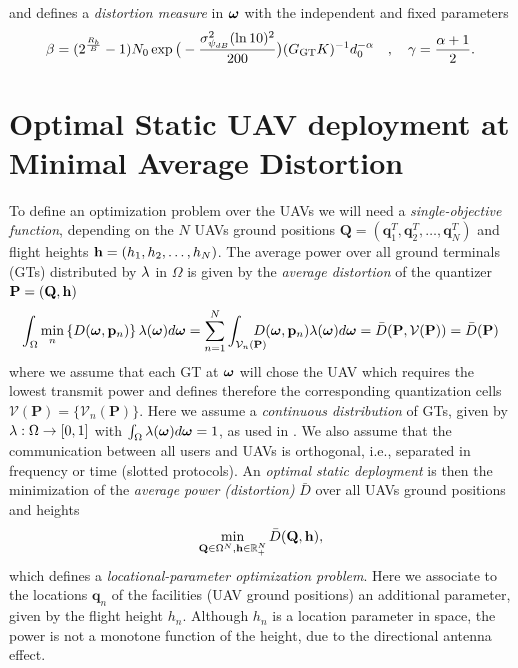 \documentclass[smallabstract,smallcaptions]{dccpaper}
\renewcommand{\vq}{\mathbf p}
\renewcommand{\vp}{\mathbf q}
\renewcommand{\vQ}{\mathbf P}
\renewcommand{\vP}{\mathbf Q}
\newcommand{\df}{\ensuremath{\lam}}         %
\newcommand{\bH}{\ensuremath{\vh}}          %
\newcommand{\Rb}{\ensuremath{R_b}}         %
\newcommand{\GGT}{\ensuremath{G_{\text{GT}}}}         %
\newcommand{\Vor}{\ensuremath{\mathcal{V}}}         %
\newcommand{\Dis}{\ensuremath{D}}                    %
\newcommand{\AvDis}{\ensuremath{\bar{\Dis}}}         %
\begin{document}
%
and defines a \emph{distortion measure} in $\boldsymbol{ \omega}$ with the independent and fixed parameters
%
\begin{align}
  \bet=(2^{\frac{\Rb}{B}}-1) N_0 \exp\big(-\frac{\sig_{\psi_{dB}}^2 (\ln 10)^2}{200}\big)(\GGT K)^{-1} d_0^{-\alp}\quad,\quad
  \gam=\frac{\alp+1}{2}.
\end{align}
%


\section{Optimal Static UAV deployment at Minimal Average Distortion}

To define an optimization problem over the UAVs we will need a \emph{single-objective function}, depending   
on the $N$ UAVs ground positions $\vP=(\vp_1^T,\vp_2^T,\dots,\vp^T_N)$ and flight heights
${\mathbf h}=(h_1,h_2,\dots,h_N)$.  The average power over all ground terminals (GTs)
distributed by $\df$ in $\Omega$ is given by the \emph{average distortion} of the quantizer $\vQ=(\vP,\vh)$
%
\begin{equation}
 \int_{\Omega}\min_{n} \left\{ \Dis(\vome,\vq_n) \right\} \df(\vome)d\vome = \sum_{n=1}^N \int_{\Vor_n(\vQ)} \!\!\!\!\!\!\!D(\vome,\vq_n)\lam(\vome)d\vome=\AvDis(\vQ,\Vor(\vQ))=\AvDis(\vQ)
  \label{eq:Pbar}
\end{equation}
%
where we assume that each GT at $\boldsymbol{ \omega}$ will chose the UAV which requires the lowest transmit power and defines therefore the corresponding quantization cells $\Vor(\vQ)=\{\Vor_n(\vQ)\}$.
Here  we assume a \emph{continuous distribution} of GTs, given by $\df:\Ome\to[0,1]$ with $\int_{\Omega}\df(\vome)d\vome=1$, as
used in \cite{Erdem16,GJ,GJcom18,GJ18,Erdem1,ML,MLCS}.  We also assume that the
communication between all users and UAVs is orthogonal, i.e., separated in frequency or time (slotted protocols). An
\emph{optimal static deployment} is then the minimization of the \emph{average power (distortion)} $\AvDis$ over all UAVs ground positions and heights
\begin{align}
  \min_{\vP\in\Omega^N, \bH\in\R_+^{N}} \AvDis(\vP,\bH)\label{eq:optPbar},
\end{align}
%
which defines a \emph{locational-parameter optimization problem}.
Here we associate to the locations $\vp_n$ of the facilities (UAV ground positions) an additional parameter, given by the
flight height $h_n$.  Although $h_n$ is a location parameter in space, the power is not a monotone function of the
height, due to the directional antenna effect.  
\end{document}
